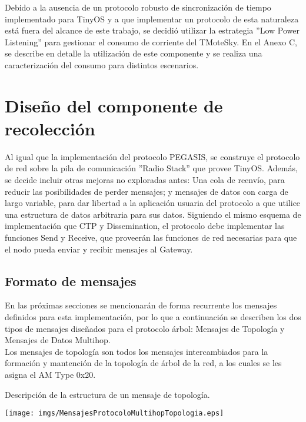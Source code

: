  Debido a la ausencia de un protocolo robusto de sincronización de tiempo implementado para TinyOS y a que implementar un protocolo de esta naturaleza está fuera del alcance de este trabajo, se decidió utilizar la estrategia ''Low Power Listening'' para gestionar el consumo de corriente del TMoteSky. En el  Anexo C, se describe en detalle la utilización de este componente y se realiza una caracterización del consumo para distintos escenarios.

\section{Diseño del componente de recolección}

Al igual que la implementación del protocolo PEGASIS, se construye el protocolo de red sobre la pila de comunicación ''Radio Stack'' que provee TinyOS. Además, se decide incluir otras mejoras no exploradas antes: Una cola de reenvío, para reducir las posibilidades de perder mensajes; y mensajes de datos con carga de largo variable, para dar libertad a la aplicación usuaria del protocolo a que utilice una estructura de datos arbitraria para sus datos. Siguiendo el mismo esquema de implementación que CTP y Dissemination, el protocolo debe implementar las funciones Send y Receive, que proveerán las funciones de red necesarias para que el nodo pueda enviar y recibir mensajes al Gateway.
\subsection{Formato de mensajes}
En las próximas secciones se mencionarán de forma recurrente los mensajes definidos para esta implementación, por lo que a continuación se describen los dos tipos de mensajes diseñados para el protocolo árbol: Mensajes de Topología y Mensajes de Datos Multihop.\\ 

Los mensajes de topología son todos los mensajes intercambiados para la formación y mantención de la topología de árbol de la red, a los cuales se les asigna el AM Type 0x20.
\begin{table}[H]
  \centering
  \caption{Descripción de la estructura de un mensaje de topología.}
 \texttt{[image: imgs/MensajesProtocoloMultihopTopologia.eps]}
\end{table}

